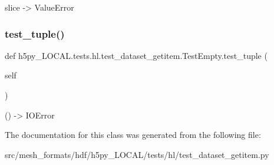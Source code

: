 \begin{DoxyVerb}slice -> ValueError \end{DoxyVerb}
 \mbox{\label{classh5py__LOCAL_1_1tests_1_1hl_1_1test__dataset__getitem_1_1TestEmpty_a9c53110040deeddaaad347a37e9403f4}} 
\subsubsection{\texorpdfstring{test\+\_\+tuple()}{test\_tuple()}}
{\footnotesize\ttfamily def h5py\+\_\+\+L\+O\+C\+A\+L.\+tests.\+hl.\+test\+\_\+dataset\+\_\+getitem.\+Test\+Empty.\+test\+\_\+tuple (\begin{DoxyParamCaption}\item[{}]{self }\end{DoxyParamCaption})}

\begin{DoxyVerb}() -> IOError \end{DoxyVerb}
 

The documentation for this class was generated from the following file\+:\begin{DoxyCompactItemize}
\item 
src/mesh\+\_\+formats/hdf/h5py\+\_\+\+L\+O\+C\+A\+L/tests/hl/test\+\_\+dataset\+\_\+getitem.\+py\end{DoxyCompactItemize}

